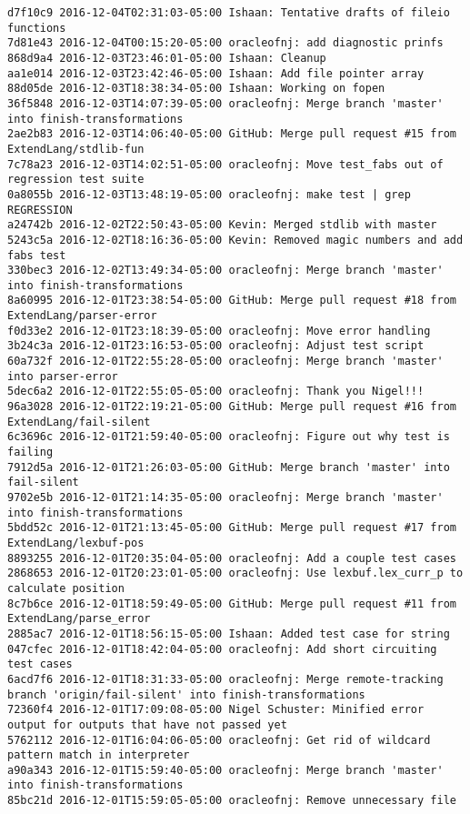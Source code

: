 \begin{lstlisting}
d7f10c9 2016-12-04T02:31:03-05:00 Ishaan: Tentative drafts of fileio functions
7d81e43 2016-12-04T00:15:20-05:00 oracleofnj: add diagnostic prinfs
868d9a4 2016-12-03T23:46:01-05:00 Ishaan: Cleanup
aa1e014 2016-12-03T23:42:46-05:00 Ishaan: Add file pointer array
88d05de 2016-12-03T18:38:34-05:00 Ishaan: Working on fopen
36f5848 2016-12-03T14:07:39-05:00 oracleofnj: Merge branch 'master' into finish-transformations
2ae2b83 2016-12-03T14:06:40-05:00 GitHub: Merge pull request #15 from ExtendLang/stdlib-fun
7c78a23 2016-12-03T14:02:51-05:00 oracleofnj: Move test_fabs out of regression test suite
0a8055b 2016-12-03T13:48:19-05:00 oracleofnj: make test | grep REGRESSION
a24742b 2016-12-02T22:50:43-05:00 Kevin: Merged stdlib with master
5243c5a 2016-12-02T18:16:36-05:00 Kevin: Removed magic numbers and add fabs test
330bec3 2016-12-02T13:49:34-05:00 oracleofnj: Merge branch 'master' into finish-transformations
8a60995 2016-12-01T23:38:54-05:00 GitHub: Merge pull request #18 from ExtendLang/parser-error
f0d33e2 2016-12-01T23:18:39-05:00 oracleofnj: Move error handling
3b24c3a 2016-12-01T23:16:53-05:00 oracleofnj: Adjust test script
60a732f 2016-12-01T22:55:28-05:00 oracleofnj: Merge branch 'master' into parser-error
5dec6a2 2016-12-01T22:55:05-05:00 oracleofnj: Thank you Nigel!!!
96a3028 2016-12-01T22:19:21-05:00 GitHub: Merge pull request #16 from ExtendLang/fail-silent
6c3696c 2016-12-01T21:59:40-05:00 oracleofnj: Figure out why test is failing
7912d5a 2016-12-01T21:26:03-05:00 GitHub: Merge branch 'master' into fail-silent
9702e5b 2016-12-01T21:14:35-05:00 oracleofnj: Merge branch 'master' into finish-transformations
5bdd52c 2016-12-01T21:13:45-05:00 GitHub: Merge pull request #17 from ExtendLang/lexbuf-pos
8893255 2016-12-01T20:35:04-05:00 oracleofnj: Add a couple test cases
2868653 2016-12-01T20:23:01-05:00 oracleofnj: Use lexbuf.lex_curr_p to calculate position
8c7b6ce 2016-12-01T18:59:49-05:00 GitHub: Merge pull request #11 from ExtendLang/parse_error
2885ac7 2016-12-01T18:56:15-05:00 Ishaan: Added test case for string
047cfec 2016-12-01T18:42:04-05:00 oracleofnj: Add short circuiting test cases
6acd7f6 2016-12-01T18:31:33-05:00 oracleofnj: Merge remote-tracking branch 'origin/fail-silent' into finish-transformations
72360f4 2016-12-01T17:09:08-05:00 Nigel Schuster: Minified error output for outputs that have not passed yet
5762112 2016-12-01T16:04:06-05:00 oracleofnj: Get rid of wildcard pattern match in interpreter
a90a343 2016-12-01T15:59:40-05:00 oracleofnj: Merge branch 'master' into finish-transformations
85bc21d 2016-12-01T15:59:05-05:00 oracleofnj: Remove unnecessary file

\end{lstlisting}
